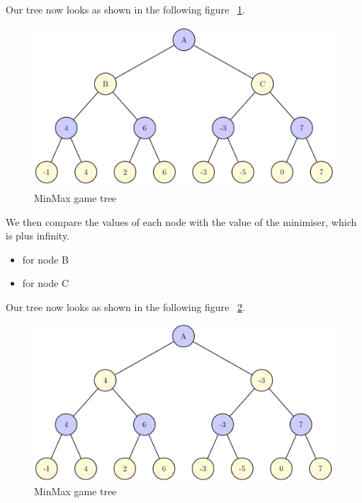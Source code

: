 \documentclass[conference,pdf,table,xcdraw, utf8]{IEEEtran}
\begin{document}
Our tree now looks as shown in the following figure ~\ref{figure:tree_step2.PNG}.

\begin{figure}[H]
    \centering
    \includegraphics[scale=0.38]{images/tree_step2.PNG}
    \caption{MinMax game tree}
    \label{figure:tree_step2.PNG}
\end{figure}


We then compare the values of each node with the value of the minimiser, which is plus infinity.

\begin{itemize}
    \item for node B 
    \item for node C 
\end{itemize}


Our tree now looks as shown in the following figure ~\ref{figure:tree_step3.PNG}.

\begin{figure}[H]
    \centering
    \includegraphics[scale=0.37]{images/tree_step3.PNG}
    \caption{MinMax game tree}
    \label{figure:tree_step3.PNG}
\end{figure}
\end{document}
